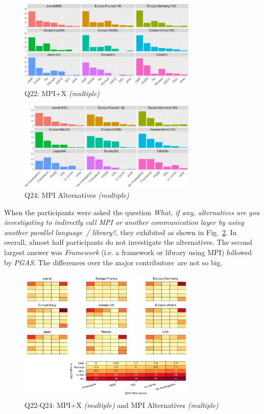 \documentclass[preprint,5p,times]{elsarticle}
\def\myquote#1{{\it #1}}
\def\mcountries{major contributors}%
\begin{document}
\begin{figure}[htb]
\begin{center}
\includegraphics[width=8.5cm]{R-scripts/Q22.pdf}
\caption{Q22: MPI+X {\it(multiple)}}
\label{fig:mpi-x}
\end{center}
\end{figure}

\begin{figure}[htb]
\begin{center}
\includegraphics[width=8.5cm]{R-scripts/Q24.pdf}
\caption{Q24: MPI Alternatives {\it(multiple)}}
\label{fig:mpi-alternatives}
\end{center}
\end{figure}

When the participants were asked the question \myquote{What, if any,
alternatives are you investigating to indirectly call MPI or another
communication layer by using another parallel language~/ library?}, they
exhibited as shown in Fig.~\ref{fig:mpi-alternatives}. In overall,
almost half participants do not investigate the alternatives. The second
largest answer was \myquote{Framework} (i.e. a framework or library
using MPI) followed by \myquote{PGAS}. The
differences over the \mcountries\  are not so big.

\begin{figure}[htb]
\begin{center}
\includegraphics[width=8.5cm]{Figs/Q22-Q24.pdf}
\caption{Q22-Q24: MPI+X {\it(multiple)} and MPI Alternatives {\it(multiple)}}
\label{fig:mpi-x-and-alternatives}
\end{center}
\end{figure}
\end{document}
